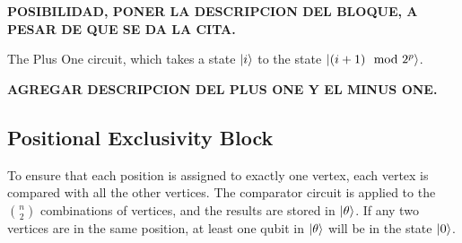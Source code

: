 \documentclass{article}
\begin{document}
\textbf{POSIBILIDAD, PONER LA DESCRIPCION DEL BLOQUE, A PESAR DE QUE SE DA LA CITA.}

The Plus One circuit, which takes a state \(\ket{i}\) to the state \(\ket{(i + 1) \mod 2^p}\).

\textbf{AGREGAR DESCRIPCION DEL PLUS ONE Y EL MINUS ONE.}


\subsection{Positional Exclusivity Block}
To ensure that each position is assigned to exactly one vertex, each vertex is compared with all the other vertices. The comparator circuit is applied to the \(\binom{n}{2}\) combinations of vertices, and the results are stored in \(\ket{\theta}\). If any two vertices are in the same position, at least one qubit in \(\ket{\theta}\) will be in the state \(\ket{0}\).
\end{document}
